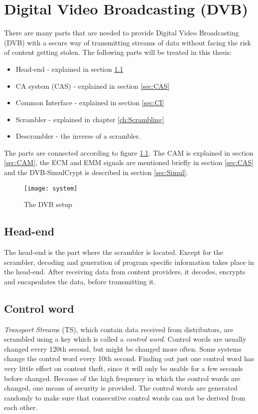 \chapter{Digital Video Broadcasting (DVB)}
There are many parts that are needed to provide Digital Video 
Broadcasting (DVB) with a secure way of transmitting streams of data 
without facing the risk of content getting stolen. The following parts 
will be treated in this thesis:

\begin{itemize}
\item Head-end - explained in section \ref{sec:HE}
\item CA system (CAS) - explained in section \ref{sec:CAS}
\item Common Interface - explained in section \ref{sec:CI}
\item Scrambler - explained in chapter \ref{ch:Scrambling}
\item Descrambler - the inverse of a scrambler.
\end{itemize}

The parts are connected according to figure \ref{fig:system}. The CAM is
explained in section \ref{sec:CAM}, the ECM and EMM signals are 
mentioned briefly in section \ref{sec:CAS} and the DVB-SimulCrypt is 
described in section \ref{sec:Simul}.

\begin{figure}[h!]
  \texttt{[image: system]}
  \caption{The DVB setup}
  \label{fig:system}
\end{figure}

\section{Head-end} \label{sec:HE}
The head-end is the part where the scrambler is located. Except for the 
scrambler, decoding and generation of program specific information takes
place in the head-end. After receiving data from content providers, it 
decodes, encrypts and encapsulates the data, before transmitting it.

\section{Control word} \label{sec:setup}
\emph{Transport Stream}s (TS), which contain data received from 
distributors, are scrambled using a key which is called a \emph{control 
word}. Control words are usually changed every 120th second, but might 
be changed more often. Some systems change the control word every 10th 
second. Finding out just one control word has very little effect on 
content theft, since it will only be usable for a few seconds before 
changed. Because of the high frequency in which the control words are 
changed, one means of security is provided. The control words are 
generated randomly to make sure that consecutive control words can not 
be derived from each other.

